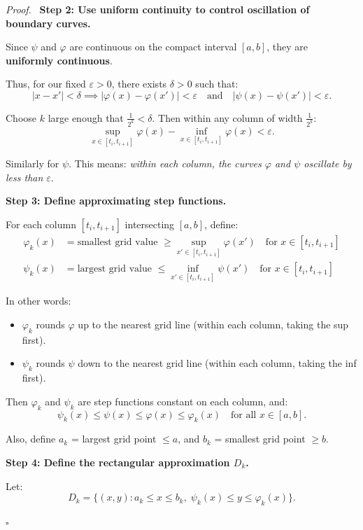 \documentclass[11pt]{report}
\renewenvironment{proof}[1][Proof]{\par\noindent\textit{#1.}\ }{\hfill$\square$\par\medskip}
\begin{document}
\begin{proof}
\textbf{Step 2: Use uniform continuity to control oscillation of boundary curves.}

Since $\psi$ and $\varphi$ are continuous on the compact interval $[a, b]$, they are \textbf{uniformly continuous}.

Thus, for our fixed $\varepsilon > 0$, there exists $\delta > 0$ such that:
\[
|x - x'| < \delta \implies |\varphi(x) - \varphi(x')| < \varepsilon \quad \text{and} \quad |\psi(x) - \psi(x')| < \varepsilon.
\]

Choose $k$ large enough that $\frac{1}{2^k} < \delta$. Then within any column of width $\frac{1}{2^k}$:
\[
\sup_{x \in [t_i, t_{i+1}]} \varphi(x) - \inf_{x \in [t_i, t_{i+1}]} \varphi(x) < \varepsilon.
\]

Similarly for $\psi$. This means: \textit{within each column, the curves $\varphi$ and $\psi$ oscillate by less than $\varepsilon$}.

\textbf{Step 3: Define approximating step functions.}

For each column $[t_i, t_{i+1}]$ intersecting $[a, b]$, define:
\begin{align*}
\varphi_k(x) &= \text{smallest grid value } \geq \sup_{x' \in [t_i, t_{i+1}]} \varphi(x') \quad \text{for } x \in [t_i, t_{i+1}] \\
\psi_k(x) &= \text{largest grid value } \leq \inf_{x' \in [t_i, t_{i+1}]} \psi(x') \quad \text{for } x \in [t_i, t_{i+1}]
\end{align*}

In other words:
\begin{itemize}
    \item $\varphi_k$ rounds $\varphi$ up to the nearest grid line (within each column, taking the sup first).
    \item $\psi_k$ rounds $\psi$ down to the nearest grid line (within each column, taking the inf first).
\end{itemize}

Then $\varphi_k$ and $\psi_k$ are step functions constant on each column, and:
\[
\psi_k(x) \leq \psi(x) \leq \varphi(x) \leq \varphi_k(x) \quad \text{for all } x \in [a, b].
\]

Also, define $a_k$ = largest grid point $\leq a$, and $b_k$ = smallest grid point $\geq b$.

\textbf{Step 4: Define the rectangular approximation $D_k$.}

Let:
\[
D_k = \{(x, y) : a_k \leq x \leq b_k, \; \psi_k(x) \leq y \leq \varphi_k(x)\}.
\]


\end{proof}
\end{document}

